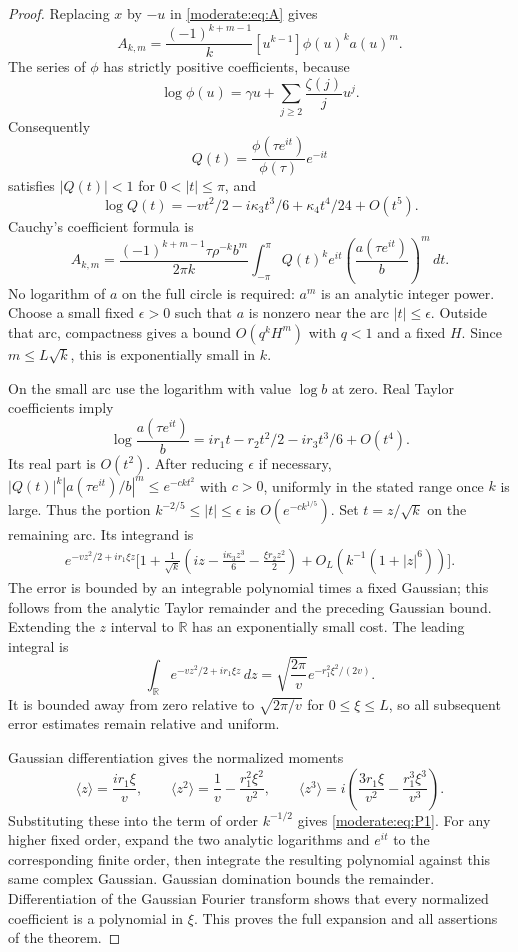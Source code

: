 \begin{proof}
Replacing $x$ by $-u$ in \eqref{moderate:eq:A} gives
\[
 A_{k,m}=\frac{(-1)^{k+m-1}}{k}
        [u^{k-1}]\phi(u)^k a(u)^m.
\]
The series of $\phi$ has strictly positive coefficients, because
\[
 \log\phi(u)=\gamma u+\sum_{j\ge2}\frac{\zeta(j)}j u^j.
\]
Consequently
\[
 Q(t)=\frac{\phi(\tau e^{it})}{\phi(\tau)}e^{-it}
\]
satisfies $|Q(t)|<1$ for $0<|t|\le\pi$, and
\[
 \log Q(t)=-vt^2/2-i\kappa_3t^3/6+\kappa_4t^4/24+O(t^5).
\]
Cauchy's coefficient formula is
\begin{equation}\label{moderate:eq:cauchy}
 A_{k,m}=\frac{(-1)^{k+m-1}\tau\rho^{-k}b^m}{2\pi k}
 \int_{-\pi}^{\pi}Q(t)^k e^{it}
       \left(\frac{a(\tau e^{it})}{b}\right)^m\,dt.
\end{equation}
No logarithm of $a$ on the full circle is required: $a^m$ is an analytic
integer power. Choose a small fixed $\epsilon>0$ such that $a$ is nonzero
near the arc $|t|\le\epsilon$. Outside that arc, compactness gives a
bound $O(q^k H^m)$ with $q<1$ and a fixed $H$. Since $m\le L\sqrt{k}$,
this is exponentially small in $k$.

On the small arc use the logarithm with value $\log b$ at zero.
Real Taylor coefficients imply
\[
 \log\frac{a(\tau e^{it})}{b}
 =ir_1t-r_2t^2/2-ir_3t^3/6+O(t^4).
\]
Its real part is $O(t^2)$. After reducing $\epsilon$ if necessary,
$|Q(t)|^k|a(\tau e^{it})/b|^m\le e^{-c kt^2}$ with $c>0$, uniformly
in the stated range once $k$ is large. Thus the portion
$k^{-2/5}\le|t|\le\epsilon$ is $O(e^{-c k^{1/5}})$.
Set $t=z/\sqrt{k}$ on the remaining arc. Its integrand is
\begin{align*}
 e^{-vz^2/2+ir_1\xi z}\bigg[1+\frac1{\sqrt{k}}
 \left(iz-\frac{i\kappa_3z^3}{6}-\frac{\xi r_2z^2}{2}\right)
 +O_L\left(k^{-1}(1+|z|^6)\right)\bigg].
\end{align*}
The error is bounded by an integrable polynomial times a fixed Gaussian;
this follows from the analytic Taylor remainder and the preceding
Gaussian bound. Extending the $z$ interval to $\mathbb R$ has an
exponentially small cost. The leading integral is
\[
 \int_{\mathbb R}e^{-vz^2/2+ir_1\xi z}\,dz
  =\sqrt{\frac{2\pi}{v}}e^{-r_1^2\xi^2/(2v)}.
\]
It is bounded away from zero relative to $\sqrt{2\pi/v}$ for
$0\le\xi\le L$, so all subsequent error estimates remain relative
and uniform.

Gaussian differentiation gives the normalized moments
\[
 \langle z\rangle=\frac{ir_1\xi}{v},\qquad
 \langle z^2\rangle=\frac1v-\frac{r_1^2\xi^2}{v^2},\qquad
 \langle z^3\rangle=i\left(\frac{3r_1\xi}{v^2}
                          -\frac{r_1^3\xi^3}{v^3}\right).
\]
Substituting these into the term of order $k^{-1/2}$ gives
\eqref{moderate:eq:P1}. For any higher fixed order, expand the two
analytic logarithms and $e^{it}$ to the corresponding finite order,
then integrate the resulting polynomial against this same complex
Gaussian. Gaussian domination bounds the remainder. Differentiation
of the Gaussian Fourier transform shows that every normalized
coefficient is a polynomial in $\xi$. This proves the full expansion
and all assertions of the theorem.
\end{proof}

